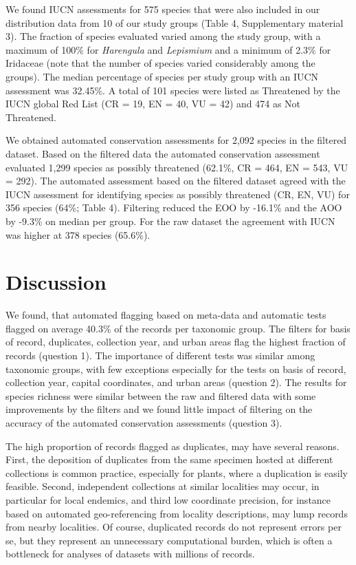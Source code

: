 \documentclass[
  12pt,
]{article}
\begin{document}
We found IUCN assessments for 575 species that were also included in our distribution data from 10 of our study groups (Table 4, Supplementary material 3). The fraction of species evaluated varied among the study group, with a maximum of 100\% for \emph{Harengula} and \emph{Lepismium} and a minimum of 2.3\% for Iridaceae (note that the number of species varied considerably among the groups). The median percentage of species per study group with an IUCN assessment was 32.45\%. A total of 101 species were listed as Threatened by the IUCN global Red List (CR = 19, EN = 40, VU = 42) and 474 as Not Threatened.

We obtained automated conservation assessments for 2,092 species in the filtered dataset. Based on the filtered data the automated conservation assessment evaluated 1,299 species as possibly threatened (62.1\%, CR = 464, EN = 543, VU = 292). The automated assessment based on the filtered dataset agreed with the IUCN assessment for identifying species as possibly threatened (CR, EN, VU) for 356 species (64\%; Table 4). Filtering reduced the EOO by -16.1\% and the AOO by -9.3\% on median per group. For the raw dataset the agreement with IUCN was higher at 378 species (65.6\%).

\hypertarget{discussion}{%
\section{Discussion}\label{discussion}}

We found, that automated flagging based on meta-data and automatic tests flagged on average 40.3\% of the records per taxonomic group. The filters for basis of record, duplicates, collection year, and urban areas flag the highest fraction of records (question 1). The importance of different tests was similar among taxonomic groups, with few exceptions especially for the tests on basis of record, collection year, capital coordinates, and urban areas (question 2). The results for species richness were similar between the raw and filtered data with some improvements by the filters and we found little impact of filtering on the accuracy of the automated conservation assessments (question 3).

The high proportion of records flagged as duplicates, may have several reasons. First, the deposition of duplicates from the same specimen hosted at different collections is common practice, especially for plants, where a duplication is easily feasible. Second, independent collections at similar localities may occur, in particular for local endemics, and third low coordinate precision, for instance based on automated geo-referencing from locality descriptions, may lump records from nearby localities. Of course, duplicated records do not represent errors per se, but they represent an unnecessary computational burden, which is often a bottleneck for analyses of datasets with millions of records.
\end{document}
